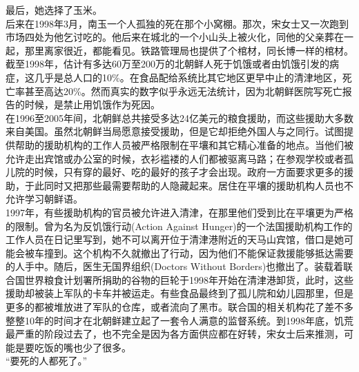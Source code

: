 \begin{multicols}{\theparacolNo}
最后，她选择了玉米。\\

后来在1998年3月，南玉一个人孤独的死在那个小窝棚。那次，宋女士又一次跑到市场四处为他乞讨吃的。他后来在城北的一个小山头上被火化，同他的父亲葬在一起，那里离家很近，都能看见。铁路管理局也提供了个棺材，同长博一样的棺材。\\

截至1998年，估计有多达60万至200万的北朝鲜人死于饥饿或者由饥饿引发的病症，这几乎是总人口的10\%。在食品配给系统比其它地区更早中止的清津地区，死亡率甚至高达20\%。然而真实的数字似乎永远无法统计，因为北朝鲜医院写死亡报告的时候，是禁止用饥饿作为死因。\\

在1996至2005年间，北朝鲜总共接受多达24亿美元的粮食援助，而这些援助大多数来自美国。虽然北朝鲜当局愿意接受援助，但是它却拒绝外国人与之同行。试图提供帮助的援助机构的工作人员被严格限制在平壤和其它精心准备的地点。当他们被允许走出宾馆或办公室的时候，衣衫褴褛的人们都被驱离马路；在参观学校或者孤儿院的时候，只有穿的最好、吃的最好的孩子才会出现。政府一方面要求更多的援助，于此同时又把那些最需要帮助的人隐藏起来。居住在平壤的援助机构人员也不允许学习朝鲜语。\\

1997年，有些援助机构的官员被允许进入清津，在那里他们受到比在平壤更为严格的限制。曾为名为反饥饿行动(Action Against Hunger)的一个法国援助机构工作的工作人员在日记里写到，她不可以离开位于清津港附近的天马山宾馆，借口是她可能会被车撞到。这个机构不久就撤出了行动，因为他们不能保证救援能够抵达需要的人手中。随后，医生无国界组织(Doctors Without Borders)也撤出了。装载着联合国世界粮食计划署所捐助的谷物的巨轮于1998年开始在清津港卸货，此时，这些援助却被装上军队的卡车并被运走。有些食品最终到了孤儿院和幼儿园那里，但是更多的都被堆放进了军队的仓库，或者流向了黑市。联合国的相关机构花了差不多整整10年的时间才在北朝鲜建立起了一套令人满意的监督系统。到1998年底，饥荒最严重的阶段过去了，也不完全是因为各方面供应都在好转，宋女士后来推测，可能是要吃饭的嘴也少了很多。\\

“要死的人都死了。”\\
\ifnum{}
	\end{multicols}
\fi